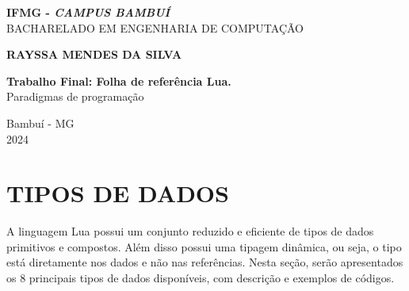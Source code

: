 \documentclass[12pt,a4paper]{article}
\begin{document}
	
	\thispagestyle{empty}
	
	\begin{center}
		\textbf{IFMG - \textit{CAMPUS BAMBUÍ}}\\
		BACHARELADO EM ENGENHARIA DE COMPUTAÇÃO
	\end{center}
	
	\vspace{6cm}
	
	\begin{center}
		\textbf{RAYSSA MENDES DA SILVA}
	\end{center}
	
	\vspace{4cm}
	
	\begin{center}
		\textbf{Trabalho Final: Folha de referência Lua.}\\
		Paradigmas de programação
	\end{center}
	
	\vfill
	
	\begin{center}
		Bambuí - MG\\
		2024
	\end{center}
	
	\newpage
	
	\section{TIPOS DE DADOS}
	A linguagem Lua possui um conjunto reduzido e eficiente de tipos de dados primitivos e compostos. Além disso possui uma tipagem dinâmica, ou seja, o tipo está diretamente nos dados e não nas referências. Nesta seção, serão apresentados os 8 principais tipos de dados disponíveis, com descrição e exemplos de códigos. 
	
\end{document}
